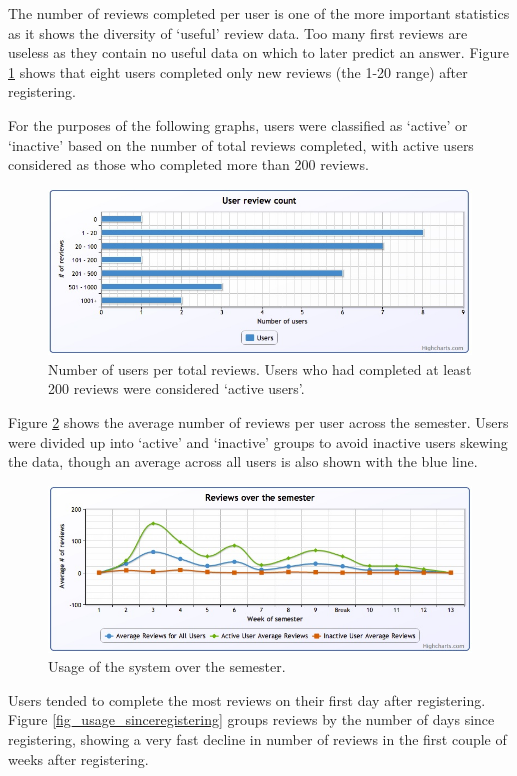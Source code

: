 The number of reviews completed per user is one of the more important statistics as
it shows the diversity of `useful' review data. Too many first reviews are useless as
they contain no useful data on which to later predict an answer.
Figure \ref{fig_usage_reviewcount} shows that eight users completed only new
reviews (the 1-20 range) after registering.

For the purposes of the following graphs, users were classified as `active' or `inactive'
based on the number of total reviews completed, with active users considered as those
who completed more than 200 reviews.

\begin{figure}[h!]
\includegraphics[width=12cm]{img/usage_reviewcount.jpg}
\caption{Number of users per total reviews. Users who had completed 
at least 200 reviews were considered `active users'.}
\label{fig_usage_reviewcount}
\end{figure}

Figure \ref{fig_usage_semester} shows the average number of reviews per user across the
semester. Users were divided up into `active' and `inactive' groups to avoid inactive
users skewing the data, though an average across all users is also shown with the blue line.

\begin{figure}[h!]
\includegraphics[width=12cm]{img/usage_semester.jpg}
\caption{Usage of the system over the semester.}
\label{fig_usage_semester}
\end{figure}

Users tended to complete the most reviews on their first day after registering.
Figure \ref{fig_usage_sinceregistering} groups
reviews by the number of days since registering, showing a very fast decline in
number of reviews in the first couple of weeks after registering.

